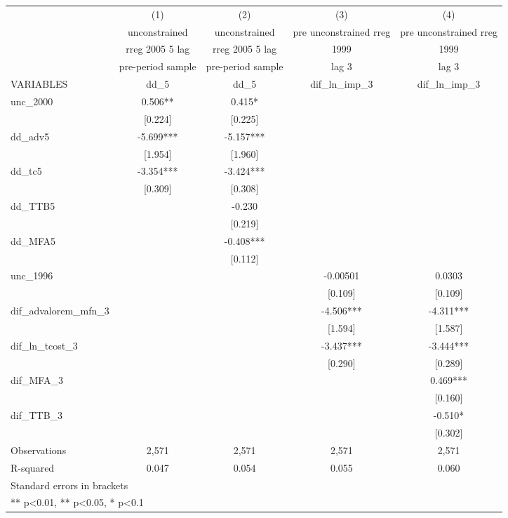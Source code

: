 \begin{tabular}{lcccc}
\toprule
 & (1) & (2) & (3) & (4) \\
 & unconstrained & unconstrained & pre unconstrained rreg & pre unconstrained rreg \\
 & rreg 2005 5 lag & rreg 2005 5 lag & 1999 & 1999 \\
 & pre-period sample & pre-period sample & lag 3 & lag 3 \\
VARIABLES & dd\_5 & dd\_5 & dif\_ln\_imp\_3 & dif\_ln\_imp\_3 \\
\midrule
unc\_2000 & 0.506** & 0.415* &  &  \\
 & [0.224] & [0.225] &  &  \\
dd\_adv5 & -5.699*** & -5.157*** &  &  \\
 & [1.954] & [1.960] &  &  \\
dd\_tc5 & -3.354*** & -3.424*** &  &  \\
 & [0.309] & [0.308] &  &  \\
dd\_TTB5 &  & -0.230 &  &  \\
 &  & [0.219] &  &  \\
dd\_MFA5 &  & -0.408*** &  &  \\
 &  & [0.112] &  &  \\
unc\_1996 &  &  & -0.00501 & 0.0303 \\
 &  &  & [0.109] & [0.109] \\
dif\_advalorem\_mfn\_3 &  &  & -4.506*** & -4.311*** \\
 &  &  & [1.594] & [1.587] \\
dif\_ln\_tcost\_3 &  &  & -3.437*** & -3.444*** \\
 &  &  & [0.290] & [0.289] \\
dif\_MFA\_3 &  &  &  & 0.469*** \\
 &  &  &  & [0.160] \\
dif\_TTB\_3 &  &  &  & -0.510* \\
 &  &  &  & [0.302] \\
\midrule
Observations & 2,571 & 2,571 & 2,571 & 2,571 \\
R-squared & 0.047 & 0.054 & 0.055 & 0.060 \\
\bottomrule
\multicolumn{5}{l}{\footnotesize Standard errors in brackets} \\
\multicolumn{5}{l}{\footnotesize *** p<0.01, ** p<0.05, * p<0.1} \\
\end{tabular}
